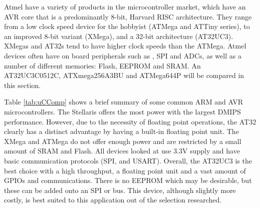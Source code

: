 Atmel have a variety of products in the microcontroller market, which have an AVR core that is a predominantly 8-bit, Harvard RISC architecture. They range from a low clock speed device for the hobbyist (ATMega and ATTiny series), to an improved 8-bit variant (XMega), and a 32-bit architecture (AT32UC3). XMegas and AT32s tend to have higher clock speeds than the ATMega. Atmel devices often have on board peripherals such as \itc , SPI and ADCs, as well as a number of different memories: Flash, EEPROM and SRAM. An AT32UC3C0512C, ATXmega256A3BU and ATMega644P will be compared in this section. 


Table \ref{tab:uCComp} shows a brief summary of some common ARM and AVR microcontrollers. The Stellaris offers the most power with the largest DMIPS performance. However, due to the necessity of floating point operations, the AT32 clearly has a distinct advantage by having a built-in floating point unit. The XMega and ATMega do not offer enough power and are restricted by a small amount of SRAM and Flash. All devices looked at use 3.3V supply and have basic communication protocols (SPI, \itc and USART). Overall, the AT32UC3 is the best choice with a high throughput, a floating point unit and a vast amount of GPIOs and communications. There is no EEPROM which may be desirable, but these can be added onto an SPI or \itc bus. This device, although slightly more costly, is best suited to this application out of the selection researched.

